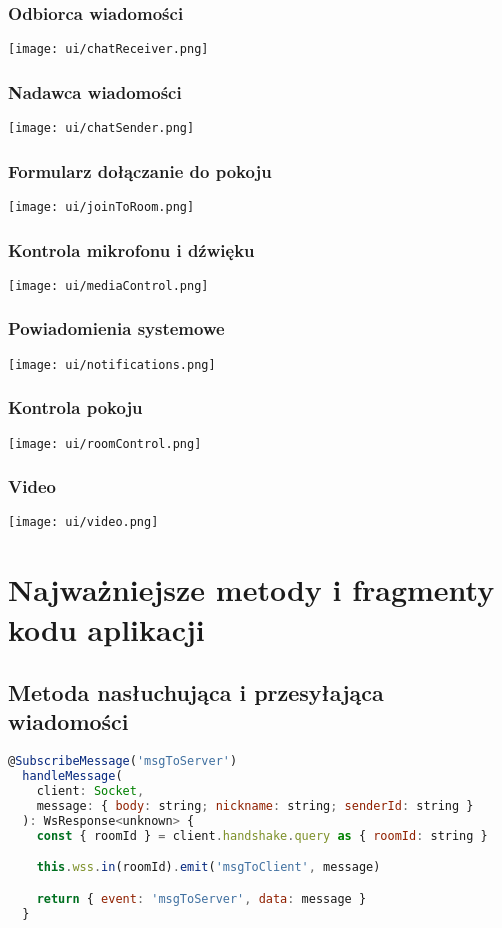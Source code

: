 \documentclass{article}
\begin{document}
\subsubsection{Odbiorca wiadomości}
\texttt{[image: ui/chatReceiver.png]}

\subsubsection{Nadawca wiadomości}
\texttt{[image: ui/chatSender.png]}

\subsubsection{Formularz dołączanie do pokoju}
\texttt{[image: ui/joinToRoom.png]}

\subsubsection{Kontrola mikrofonu i dźwięku}
\texttt{[image: ui/mediaControl.png]}

\subsubsection{Powiadomienia systemowe}
\texttt{[image: ui/notifications.png]}

\subsubsection{Kontrola pokoju}
\texttt{[image: ui/roomControl.png]}

\subsubsection{Video}
\texttt{[image: ui/video.png]}

\section{Najważniejsze metody i fragmenty kodu aplikacji}

\subsection{Metoda nasłuchująca i przesyłająca wiadomości}
\begin{lstlisting}[language=JavaScript]
  @SubscribeMessage('msgToServer')
  handleMessage(
    client: Socket,
    message: { body: string; nickname: string; senderId: string }
  ): WsResponse<unknown> {
    const { roomId } = client.handshake.query as { roomId: string }

    this.wss.in(roomId).emit('msgToClient', message)

    return { event: 'msgToServer', data: message }
  }
\end{lstlisting}
\end{document}
